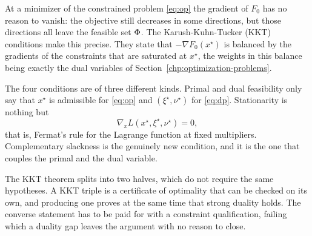      At a minimizer of the constrained problem \eqref{eq:op} the gradient of $F_0$ has no reason to vanish: the objective still decreases in some directions, but those directions all leave the feasible set $\operatorname{\Phi}$. The Karush-Kuhn-Tucker (KKT) conditions make this precise. They state that $-\nabla F_0(x^\star)$ is balanced by the gradients of the constraints that are saturated at $x^\star$, the weights in this balance being exactly the dual variables of Section~\ref{chp:optimization-problems}.


     The four conditions are of three different kinds. Primal and dual feasibility only say that $x^\star$ is admissible for \eqref{eq:op} and $(\xi^\star,\nu^\star)$ for \eqref{eq:dp}. Stationarity is nothing but
     \begin{equation}
         \nabla_x L(x^\star,\xi^\star,\nu^\star) = 0,
     \end{equation}
     that is, Fermat's rule for the Lagrange function at fixed multipliers. Complementary slackness is the genuinely new condition, and it is the one that couples the primal and the dual variable.

     The KKT theorem splits into two halves, which do not require the same hypotheses. A KKT triple is a certificate of optimality that can be checked on its own, and producing one proves at the same time that strong duality holds. The converse statement has to be paid for with a constraint qualification, failing which a duality gap leaves the argument with no reason to close.

